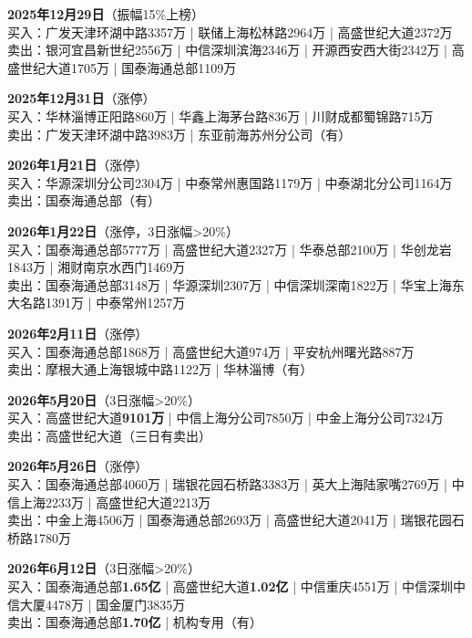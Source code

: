 \documentclass[a4paper,11pt,fontset=none]{ctexart}
\begin{document}
\textbf{2025年12月29日}（振幅15\%上榜）\\
买入：广发天津环湖中路3357万 | 联储上海松林路2964万 | 高盛世纪大道2372万\\
卖出：银河宜昌新世纪2556万 | 中信深圳滨海2346万 | 开源西安西大街2342万 | 高盛世纪大道1705万 | 国泰海通总部1109万

\vspace{0.4em}
\textbf{2025年12月31日}（涨停）\\
买入：华林淄博正阳路860万 | 华鑫上海茅台路836万 | 川财成都蜀锦路715万\\
卖出：广发天津环湖中路3983万 | 东亚前海苏州分公司（有）

\vspace{0.4em}
\textbf{2026年1月21日}（涨停）\\
买入：华源深圳分公司2304万 | 中泰常州惠国路1179万 | 中泰湖北分公司1164万\\
卖出：国泰海通总部（有）

\vspace{0.4em}
\textbf{2026年1月22日}（涨停，3日涨幅>20\%）\\
买入：国泰海通总部5777万 | 高盛世纪大道2327万 | 华泰总部2100万 | 华创龙岩1843万 | 湘财南京水西门1469万\\
卖出：国泰海通总部3148万 | 华源深圳2307万 | 中信深圳深南1822万 | 华宝上海东大名路1391万 | 中泰常州1257万

\vspace{0.4em}
\textbf{2026年2月11日}（涨停）\\
买入：国泰海通总部1868万 | 高盛世纪大道974万 | 平安杭州曙光路887万\\
卖出：摩根大通上海银城中路1122万 | 华林淄博（有）

\vspace{0.4em}
\textbf{2026年5月20日}（3日涨幅>20\%）\\
买入：高盛世纪大道\textbf{9101万} | 中信上海分公司7850万 | 中金上海分公司7324万\\
卖出：高盛世纪大道（三日有卖出）

\vspace{0.4em}
\textbf{2026年5月26日}（涨停）\\
买入：国泰海通总部4060万 | 瑞银花园石桥路3383万 | 英大上海陆家嘴2769万 | 中信上海2233万 | 高盛世纪大道2213万\\
卖出：中金上海4506万 | 国泰海通总部2693万 | 高盛世纪大道2041万 | 瑞银花园石桥路1780万

\vspace{0.4em}
\textbf{2026年6月12日}（3日涨幅>20\%）\\
买入：国泰海通总部\textbf{1.65亿} | 高盛世纪大道\textbf{1.02亿} | 中信重庆4551万 | 中信深圳中信大厦4478万 | 国金厦门3835万\\
卖出：国泰海通总部\textbf{1.70亿} | 机构专用（有）
\end{document}
